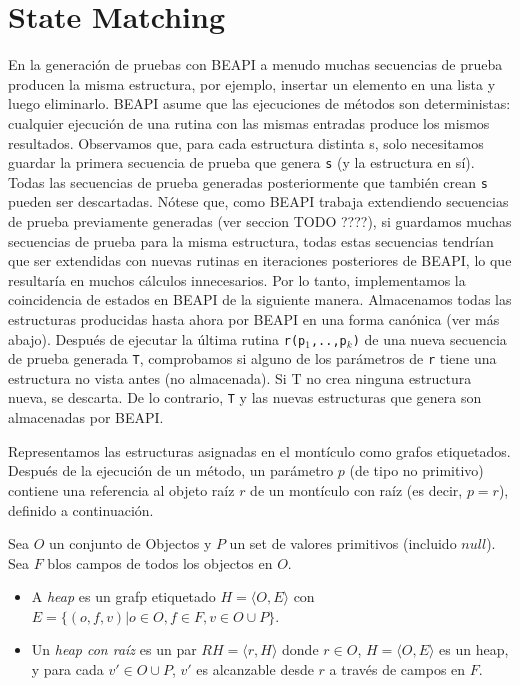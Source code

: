 \section{State Matching}
\label{sec:state-matching}

En la generación de pruebas con \textsf{BEAPI} a menudo muchas secuencias de prueba producen la misma estructura, por ejemplo, insertar un elemento en una lista y luego eliminarlo. \textsf{BEAPI} asume que las ejecuciones de métodos son deterministas: cualquier ejecución de una rutina con las mismas entradas produce los mismos resultados. Observamos que, para cada estructura distinta s, solo necesitamos guardar la primera secuencia de prueba que genera \texttt{s} (y la estructura en sí). Todas las secuencias de prueba generadas posteriormente que también crean \texttt{s} pueden ser descartadas. Nótese que, como \textsf{BEAPI} trabaja extendiendo secuencias de prueba previamente generadas (ver seccion TODO ????), si guardamos muchas secuencias de prueba para la misma estructura, todas estas secuencias tendrían que ser extendidas con nuevas rutinas en iteraciones posteriores de \textsf{BEAPI}, lo que resultaría en muchos cálculos innecesarios. Por lo tanto, implementamos la coincidencia de estados en \textsf{BEAPI} de la siguiente manera. Almacenamos todas las estructuras producidas hasta ahora por \textsf{BEAPI} en una forma canónica (ver más abajo). Después de ejecutar la última rutina \texttt{r(p$_1$,..,p$_k$)} de una nueva secuencia de prueba generada \texttt{T}, comprobamos si alguno de los parámetros de \texttt{r} tiene una estructura no vista antes (no almacenada). Si T no crea ninguna estructura nueva, se descarta. De lo contrario, \texttt{T} y las nuevas estructuras que genera son almacenadas por \textsf{BEAPI}.

Representamos las estructuras asignadas en el montículo como grafos etiquetados. Después de la ejecución de un método, un parámetro $p$  (de tipo no primitivo) contiene una referencia al objeto raíz $r$ de un montículo con raíz (es decir,  $p=r$), definido a continuación.

\begin{definition}
    Sea $O$ un conjunto de Objectos y $P$ un set de valores primitivos (incluido $null$). Sea $F$ blos campos de todos los objectos en $O$. 
    \begin{itemize}
        \item A \emph{heap} es un grafp etiquetado $H = \langle O,E\rangle$ con $E = \{(o,f,v) | o \in O, f \in F, v \in O \cup P\}$.
        \item Un \emph{heap con raíz} es un par $RH = \langle r, H\rangle$ donde
            $r \in O$, $H = \langle O,E\rangle$ es un heap, y para cada $v' \in O \cup P$, $v'$ es alcanzable desde $r$ a través de campos en $F$.
    \end{itemize}
\end{definition}

